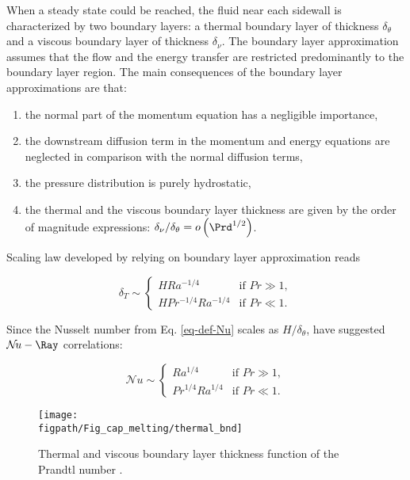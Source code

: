 When a steady state could be reached, the fluid near each sidewall is characterized by two boundary layers: a thermal boundary layer of thickness $\delta_{\theta}$ and a viscous boundary layer of thickness $\delta_\nu$.
The boundary layer approximation assumes that the flow and the energy transfer are restricted predominantly to the boundary layer region.
The main consequences of the boundary layer approximations are that:
\begin{enumerate}[label=(\roman*)]
\item the normal part of the momentum equation has a negligible importance,
\item the downstream diffusion term in the momentum and energy equations are neglected in comparison with the normal diffusion terms,
\item the pressure distribution is purely hydrostatic,
\item the thermal and the viscous boundary layer thickness are given by the order of magnitude expressions: $\delta_\nu/\delta_\theta = o \left(\Prd^{1/2} \right)$.
\end{enumerate}

\noindent Scaling law developed by \cite{bejan2013convection} relying on boundary layer approximation reads

\begin{equation} \label{eq-bnd-layer-T}
   \delta_T \sim \left\{
   \begin{array}{ll}
   H Ra^{-1/4} &	 \mbox{if }  Pr \gg 1,\\
   H Pr^{-1/4} Ra^{-1/4} &   \mbox{if } Pr \ll 1.
   \end{array}
   \right.
\end{equation}

\noindent Since the Nusselt number from Eq. \ref{eq-def-Nu} scales as $H/\delta_\theta$, \cite{bejan2013convection} have suggested $\mathcal{N}\!u - \Ray$ correlations:

\begin{equation} \label{eq-Nu}
   \mathcal{N}\!u \sim \left\{
   \begin{array}{ll}
   Ra^{1/4} &	 \mbox{if }  Pr \gg 1,\\
   Pr^{1/4} Ra^{1/4} &   \mbox{if } Pr \ll 1.
   \end{array}
   \right.
\end{equation}

\begin{figure}
	\begin{center}
		\texttt{[image: \\figpath/Fig\_cap\_melting/thermal\_bnd]}
	\end{center}
	\caption{Thermal and viscous boundary layer thickness function of the Prandtl number \citep{bejan2013convection}.}
	\label{fig:min-size-bnd}
\end{figure}

